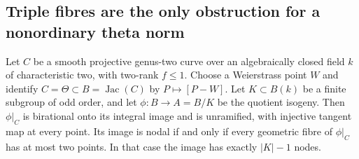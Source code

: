 \subsection{Triple fibres are the only obstruction for a nonordinary theta norm}

\begin{lemma}
\label{lem:root-nonordinary-odd-theta-nodality}
Let $C$ be a smooth projective genus-two curve over an algebraically
closed field $k$ of characteristic two, with two-rank $f\leq1$.
Choose a Weierstrass point $W$ and identify
$C=\Theta\subset B=\operatorname{Jac}(C)$ by $P\mapsto[P-W]$.
Let $K\subset B(k)$ be a finite subgroup of odd order, and let
$\phi:B\to A=B/K$ be the quotient isogeny.
Then $\phi|_C$ is birational onto its integral image and is
unramified, with injective tangent map at every point. Its image
is nodal if and only if every
geometric fibre of $\phi|_C$ has at most two points. In that case
the image has exactly $|K|-1$ nodes.
\end{lemma}
